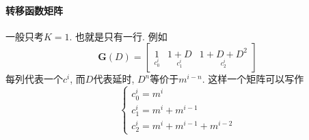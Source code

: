 \documentclass[a4paper]{report}
\begin{document}

\paragraph{转移函数矩阵}
一般只考$K=1$. 也就是只有一行. 
例如
$$\textbf{G}(D)=\begin{bmatrix}
  \underset{c_0^i}{1}&\underset{c_1^i}{1+D}&\underset{c_2^i}{1+D+D^2}
\end{bmatrix}$$
每列代表一个$c^i$, 而$D$代表延时, $D^n$等价于$m^{i-n}$. 这样一个矩阵可以写作
$$\begin{cases}
  c_0^i=m^i
  \\c_1^i=m^i+m^{i-1}
  \\c_2^i=m^i+m^{i-1}+m^{i-2}
\end{cases}$$
\end{document}
